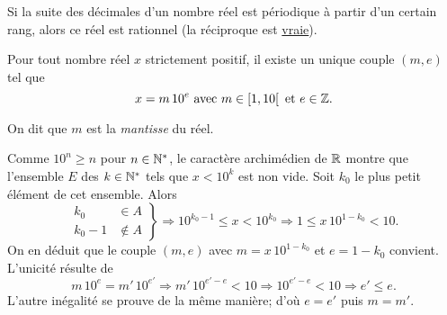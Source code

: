 \begin{rem}
 Si la suite des décimales d'un nombre réel est périodique à partir d'un certain rang, alors ce réel est rationnel (la réciproque est  \href{\baseurl C2142.pdf}{vraie}).
\end{rem}
\begin{prop} 
 Pour tout nombre réel $x$ strictement positif, il existe un unique couple $(m,e)$ tel que 
\[
 x = m\, 10^{e} \text{ avec } m \in \left[ 1, 10\right[ \text{ et } e\in \mathbb{Z}.
\]
\end{prop}
\begin{defi}
  On dit que $m$ est la \emph{mantisse} du réel.
\end{defi}

\begin{demo}
  Comme $10^n \geq n$ pour $n\in \mathbb{N}^*$, le caractère archimédien de $\mathbb{R}$ montre que l'ensemble $E$ des $k\in \mathbb{N}^*$ tels que $x < 10^k$ est non vide. Soit $k_0$ le plus petit élément de cet ensemble. Alors
\[
 \left. 
 \begin{aligned}
   k_0 &\in A \\ k_0-1 &\notin A 
 \end{aligned}
\right\rbrace 
\Rightarrow
10^{k_0 -1} \leq x < 10^{k_0} \Rightarrow 1 \leq x\, 10^{1-k_0} < 10.
\]
On en déduit que le couple $(m,e)$ avec $m = x\, 10^{1-k_0}$ et $e = 1-k_0$ convient. L'unicité résulte de
\[
  m\,10^e = m'\,10^{e'} \Rightarrow m'\,10^{e' - e}< 10 \Rightarrow 10^{e' - e}< 10 \Rightarrow e' \leq e. 
\]
L'autre inégalité se prouve de la même manière; d'où $e=e'$ puis $m=m'$.
\end{demo}

